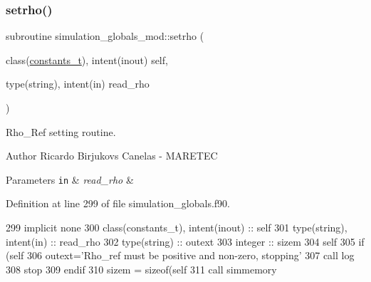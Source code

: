 \subsubsection{\texorpdfstring{setrho()}{setrho()}}
{\footnotesize\ttfamily subroutine simulation\+\_\+globals\+\_\+mod\+::setrho (\begin{DoxyParamCaption}\item[{class(\mbox{\hyperlink{structsimulation__globals__mod_1_1constants__t}{constants\+\_\+t}}), intent(inout)}]{self,  }\item[{type(string), intent(in)}]{read\+\_\+rho }\end{DoxyParamCaption})\hspace{0.3cm}{\ttfamily [private]}}



Rho\+\_\+\+Ref setting routine. 

\begin{DoxyAuthor}{Author}
Ricardo Birjukovs Canelas -\/ M\+A\+R\+E\+T\+EC
\end{DoxyAuthor}

\begin{DoxyParams}[1]{Parameters}
\mbox{\tt in}  & {\em read\+\_\+rho} & \\
\hline
\end{DoxyParams}


Definition at line 299 of file simulation\+\_\+globals.\+f90.


\begin{DoxyCode}
299     \textcolor{keywordtype}{implicit none}
300     \textcolor{keywordtype}{class}(constants\_t), \textcolor{keywordtype}{intent(inout)} :: self
301     \textcolor{keywordtype}{type}(string), \textcolor{keywordtype}{intent(in)} :: read\_rho
302     \textcolor{keywordtype}{type}(string) :: outext
303     \textcolor{keywordtype}{integer} :: sizem
304     self%
305     \textcolor{keywordflow}{if} (self%
306         outext=\textcolor{stringliteral}{'Rho\_ref must be positive and non-zero, stopping'}
307         \textcolor{keyword}{call }log%
308         stop
309 \textcolor{keywordflow}{    endif}
310     sizem = sizeof(self%
311     \textcolor{keyword}{call }simmemory%
\end{DoxyCode}
\mbox{\label{namespacesimulation__globals__mod_a64b1d91147c1cd5898fec8f23d56a65d}} 
